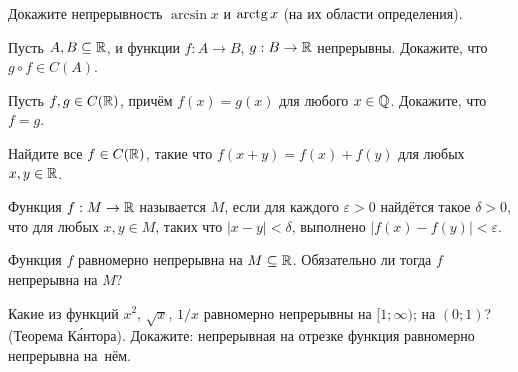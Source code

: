 \documentclass[a4paper,12pt]{article}
\begin{document}
 Докажите непрерывность %
$\arcsin x$ и $\arctg x$
(на их области определения).



Пусть $A,B\subseteq\mathbb{R}$, и функции $f:A\rightarrow B$, $g:B\rightarrow\mathbb{R}$
непрерывны. Докажите, что %
$g\circ f\in C(A)$.



Пусть $f,g\in C(\mathbb{R})$, прич\"ем $f(x)=g(x)$ для
любого $x\in\mathbb{Q}$. Докажите, что %
$f=g$.

Найдите все $f\in C(\mathbb{R})$, %
такие что
$f(x+y)=f(x)+f(y)$ для любых $x,y\in\mathbb{R}$.


Функция $f:M\rightarrow\mathbb{R}$ %
называется  %
$M$, если для каждого $\varepsilon>0$ найд\"ется такое $\delta>0$, что
для любых $x,y\in M$,
таких что $|x-y|<\delta$,
выполнено %
$|f(x)-f(y)|<\varepsilon$.

Функция $f$ равномерно непрерывна на $M\subseteq\mathbb{R}$.
Обязательно ли тогда $f$ непрерывна на $M$?


Какие из %
функций $x^2$, $\sqrt x$, $1/x$ равномерно непрерывны
на $[1;\infty)$;
на $(0;1)$?
%
%
{\small\sc (Теорема К\'антора).}
Докажите: непрерывная на отрезке функция равномерно непрерывна на~н\"ем.




\end{document}
